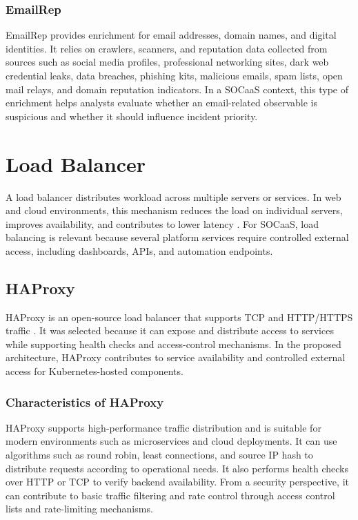 \subsubsection{EmailRep}

EmailRep provides enrichment for email addresses, domain names, and digital identities. It relies on crawlers, scanners, and reputation data collected from sources such as social media profiles, professional networking sites, dark web credential leaks, data breaches, phishing kits, malicious emails, spam lists, open mail relays, and domain reputation indicators. In a SOCaaS context, this type of enrichment helps analysts evaluate whether an email-related observable is suspicious and whether it should influence incident priority.

\section{Load Balancer}
\label{sec:loadbalancer}

A load balancer distributes workload across multiple servers or services. In web and cloud environments, this mechanism reduces the load on individual servers, improves availability, and contributes to lower latency \cite{loadbalancer}. For SOCaaS, load balancing is relevant because several platform services require controlled external access, including dashboards, APIs, and automation endpoints.

\subsection{HAProxy}
\label{subsec:haproxy}

HAProxy is an open-source load balancer that supports TCP and HTTP/HTTPS traffic \cite{haproxy-docs}. It was selected because it can expose and distribute access to services while supporting health checks and access-control mechanisms. In the proposed architecture, HAProxy contributes to service availability and controlled external access for Kubernetes-hosted components.

\subsubsection{Characteristics of HAProxy}

HAProxy supports high-performance traffic distribution and is suitable for modern environments such as microservices and cloud deployments. It can use algorithms such as round robin, least connections, and source IP hash to distribute requests according to operational needs. It also performs health checks over HTTP or TCP to verify backend availability. From a security perspective, it can contribute to basic traffic filtering and rate control through access control lists and rate-limiting mechanisms.

